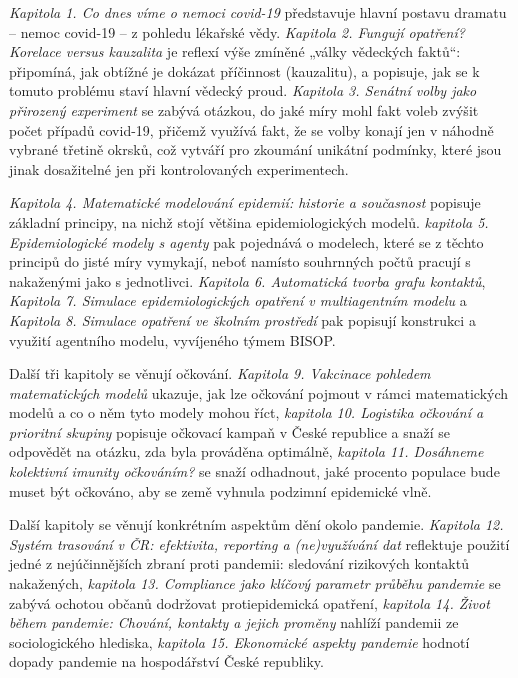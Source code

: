 {\em Kapitola 1. Co dnes víme o nemoci covid-19} představuje hlavní postavu dramatu -- nemoc covid-19 -- z pohledu lékařské vědy.
{\em Kapitola 2. Fungují opatření? Korelace versus kauzalita} je reflexí výše zmíněné „války vědeckých faktů“: připomíná, jak obtížné je dokázat příčinnost (kauzalitu), a popisuje, jak se k tomuto problému staví hlavní vědecký proud. {\em Kapitola 3. Senátní volby jako přirozený experiment} se zabývá otázkou, do jaké míry mohl fakt voleb zvýšit počet případů covid-19, přičemž využívá fakt, že se volby konají jen v náhodně vybrané třetině okrsků, což vytváří pro zkoumání unikátní podmínky, které jsou jinak dosažitelné jen při kontrolovaných experimentech.

{\em Kapitola 4. Matematické modelování epidemií: historie a současnost} popisuje základní principy, na nichž stojí většina epidemiologických modelů.
{\em kapitola 5. Epidemiologické modely s agenty} pak pojednává o modelech, které se z těchto principů do jisté míry vymykají, neboť namísto souhrnných počtů pracují s nakaženými jako s jednotlivci. {\em Kapitola 6. Automatická tvorba grafu kontaktů}, {\em Kapitola 7. Simulace epidemiologických opatření v multiagentním modelu} a {\em Kapitola 8. Simulace opatření ve školním prostředí} pak popisují konstrukci a využití agentního modelu, vyvíjeného týmem BISOP.

Další tři kapitoly se věnují očkování. {\em Kapitola 9. Vakcinace pohledem matematických modelů} ukazuje, jak lze očkování pojmout v rámci matematických modelů a co o něm tyto modely mohou říct, {\em kapitola 10. Logistika očkování a prioritní skupiny} popisuje očkovací kampaň v České republice a snaží se odpovědět na otázku, zda byla prováděna optimálně, {\em kapitola 11. Dosáhneme kolektivní imunity očkováním?} se snaží odhadnout, jaké procento populace bude muset být očkováno, aby se země vyhnula podzimní epidemické vlně.

Další kapitoly se věnují konkrétním aspektům dění okolo pandemie. 
{\em Kapitola 12. Systém trasování v ČR: efektivita, reporting a (ne)využívání dat} reflektuje použití jedné z nejúčinnějších zbraní proti pandemii: sledování rizikových kontaktů nakažených, {\em kapitola 13. Compliance jako klíčový parametr průběhu pandemie} se zabývá ochotou občanů dodržovat protiepidemická opatření, {\em kapitola 14. Život během pandemie: Chování, kontakty a jejich proměny} nahlíží pandemii ze sociologického hlediska, {\em kapitola 15. Ekonomické aspekty pandemie} hodnotí dopady pandemie na hospodářství České republiky.

